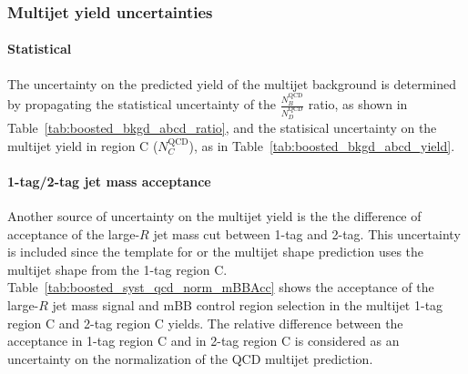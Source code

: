 %
%
\subsubsection{Multijet yield uncertainties}
\label{sec:boosted_bkgd_qcdmultijet_yield_unc}
 
\paragraph{Statistical} 
The uncertainty on the predicted yield of the multijet background is determined by propagating the statistical uncertainty
of the $\frac{N_B^\text{QCD}}{N_D^\text{QCD}}$ ratio, as shown in Table~\ref{tab:boosted_bkgd_abcd_ratio}, and the statisical
uncertainty on the multijet yield in region C ($N_C^\text{QCD}$), as in Table~\ref{tab:boosted_bkgd_abcd_yield}.
 
\paragraph{1-tag/2-tag jet mass acceptance} 
Another source of uncertainty on the multijet yield is the  
the difference of acceptance of the large-$R$ jet mass cut between 1-tag and 2-tag.
This uncertainty is included since the template for or the multijet shape prediction uses the multijet shape
from the 1-tag region C. Table~\ref{tab:boosted_syst_qcd_norm_mBBAcc} shows the acceptance
of the large-$R$ jet mass signal and mBB control region selection in the multijet 1-tag region C and 2-tag region C yields.
The relative difference between the acceptance in 1-tag region C and in 2-tag region C is considered as an uncertainty on the normalization
of the QCD multijet prediction.
 

